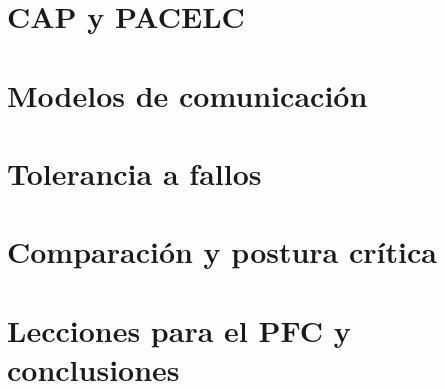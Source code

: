 \section{CAP y PACELC}

\section{Modelos de comunicación}

\section{Tolerancia a fallos}

\section{Comparación y postura crítica}

\section{Lecciones para el PFC y conclusiones}

